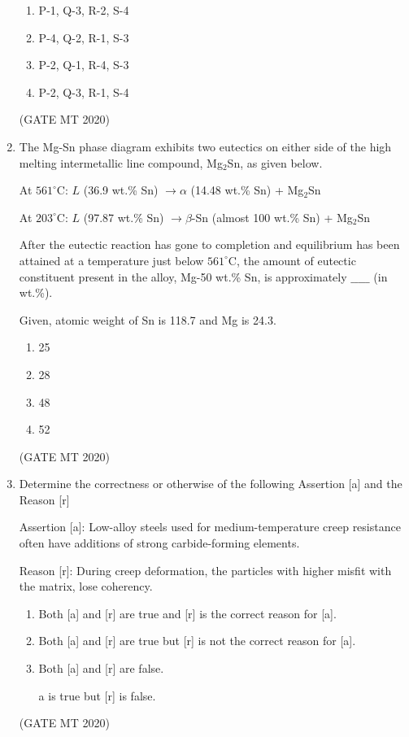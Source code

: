 \documentclass[journal, 11pt, onecolumn]{IEEEtran}
\theoremstyle{remark}
\begin{document}
\begin{enumerate}
\begin{enumerate}
\item P-1, Q-3, R-2, S-4  
\item P-4, Q-2, R-1, S-3  
\item P-2, Q-1, R-4, S-3  
\item P-2, Q-3, R-1, S-4  
\end{enumerate}
\hfill(GATE MT 2020)


\item The Mg-Sn phase diagram exhibits two eutectics on either side of the high melting intermetallic line compound, Mg$_2$Sn, as given below.  

At $561^\circ$C: $L$ (36.9 wt.\% Sn) $\rightarrow \alpha$ (14.48 wt.\% Sn) + Mg$_2$Sn  

At $203^\circ$C: $L$ (97.87 wt.\% Sn) $\rightarrow \beta$-Sn (almost 100 wt.\% Sn) + Mg$_2$Sn  

After the eutectic reaction has gone to completion and equilibrium has been attained at a temperature just below $561^\circ$C, the amount of eutectic constituent present in the alloy, Mg-50 wt.\% Sn, is approximately $\_\_\_\_\_$ (in wt.\%).  

Given, atomic weight of Sn is 118.7 and Mg is 24.3.  

\begin{enumerate}
\item 25  
\item 28  
\item 48  
\item 52  
\end{enumerate}
\hfill(GATE MT 2020)


\item Determine the correctness or otherwise of the following Assertion [a] and the Reason [r]  

Assertion [a]: Low-alloy steels used for medium-temperature creep resistance often have additions of strong carbide-forming elements.  

Reason [r]: During creep deformation, the particles with higher misfit with the matrix, lose coherency.  

\begin{enumerate} 
\item Both [a] and [r] are true and [r] is the correct reason for [a].  
\item Both [a] and [r] are true but [r] is not the correct reason for [a].  
\item Both [a] and [r] are false.  
\item [a] is true but [r] is false.  
\end{enumerate}
\hfill(GATE MT 2020)



\end{enumerate}
\end{document}
